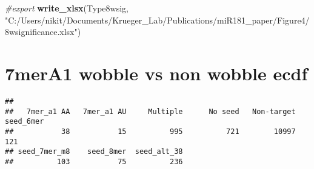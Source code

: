 \documentclass[
]{article}
\newenvironment{Shaded}{\begin{snugshade}}{\end{snugshade}}
\newcommand{\CommentTok}[1]{\textcolor[rgb]{0.56,0.35,0.01}{\textit{#1}}}
\newcommand{\FunctionTok}[1]{\textcolor[rgb]{0.13,0.29,0.53}{\textbf{#1}}}
\newcommand{\NormalTok}[1]{#1}
\newcommand{\OtherTok}[1]{\textcolor[rgb]{0.56,0.35,0.01}{#1}}
\newcommand{\SpecialCharTok}[1]{\textcolor[rgb]{0.81,0.36,0.00}{\textbf{#1}}}
\newcommand{\StringTok}[1]{\textcolor[rgb]{0.31,0.60,0.02}{#1}}
\begin{document}
\begin{Shaded}
\begin{Highlighting}[]
\CommentTok{\#export}
\FunctionTok{write\_xlsx}\NormalTok{(Type8wsig, }\StringTok{"C:/Users/nikit/Documents/Krueger\_Lab/Publications/miR181\_paper/Figure4/8wsignificance.xlsx"}\NormalTok{)}
\end{Highlighting}
\end{Shaded}

\hypertarget{mera1-wobble-vs-non-wobble-ecdf}{%
\section{7merA1 wobble vs non wobble
ecdf}\label{mera1-wobble-vs-non-wobble-ecdf}}

\begin{Shaded}
\end{Shaded}

\begin{verbatim}
## 
##   7mer_a1 AA   7mer_a1 AU     Multiple      No seed   Non-target    seed_6mer 
##           38           15          995          721        10997          121 
## seed_7mer_m8    seed_8mer  seed_alt_38 
##          103           75          236
\end{verbatim}
\end{document}
